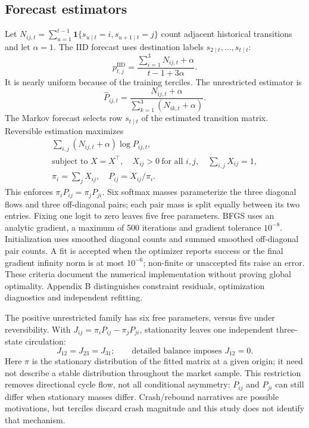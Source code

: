 \subsection{Forecast estimators}
Let $N_{ij,t}=\sum_{u=1}^{t-1}\mathbf{1}\{s_{u\mid t}=i,s_{u+1\mid t}=j\}$ count adjacent historical transitions and let $\alpha=1$. The IID forecast uses destination labels $s_{2\mid t},\ldots,s_{t\mid t}$:
\begin{equation}
p^{\mathrm{IID}}_{t,j}=\frac{\sum_{i=1}^3N_{ij,t}+\alpha}{t-1+3\alpha}.
\label{eq:iid}
\end{equation}
It is nearly uniform because of the training terciles. The unrestricted estimator is
\begin{equation}
\widehat P_{ij,t}=\frac{N_{ij,t}+\alpha}{\sum_{k=1}^3(N_{ik,t}+\alpha)}.
\label{eq:markov}
\end{equation}
The Markov forecast selects row $s_{t\mid t}$ of the estimated transition matrix. Reversible estimation maximizes
\begin{equation}
\begin{gathered}
\sum_{i,j}(N_{ij,t}+\alpha)\log P_{ij,t},\\
\text{subject to }X=X^\top,\quad X_{ij}>0\ \text{for all }i,j,\quad \sum_{i,j}X_{ij}=1,\\
\pi_i=\sum_jX_{ij},\quad P_{ij}=X_{ij}/\pi_i.
\end{gathered}
\label{eq:reversible}
\end{equation}
This enforces $\pi_iP_{ij}=\pi_jP_{ji}$. Six softmax masses parameterize the three diagonal flows and three off-diagonal pairs; each pair mass is split equally between its two entries. Fixing one logit to zero leaves five free parameters. BFGS uses an analytic gradient, a maximum of 500 iterations and gradient tolerance $10^{-8}$. Initialization uses smoothed diagonal counts and summed smoothed off-diagonal pair counts. A fit is accepted when the optimizer reports success or the final gradient infinity norm is at most $10^{-6}$; non-finite or unaccepted fits raise an error. These criteria document the numerical implementation without proving global optimality. Appendix B distinguishes constraint residuals, optimization diagnostics and independent refitting.

The positive unrestricted family has six free parameters, versus five under reversibility. With $J_{ij}=\pi_iP_{ij}-\pi_jP_{ji}$, stationarity leaves one independent three-state circulation:
\begin{equation}
J_{12}=J_{23}=J_{31};\qquad\text{detailed balance imposes }J_{12}=0.
\label{eq:flow}
\end{equation}
Here $\pi$ is the stationary distribution of the fitted matrix at a given origin; it need not describe a stable distribution throughout the market sample. This restriction removes directional cycle flow, not all conditional asymmetry: $P_{ij}$ and $P_{ji}$ can still differ when stationary masses differ. Crash/rebound narratives are possible motivations, but terciles discard crash magnitude and this study does not identify that mechanism.

